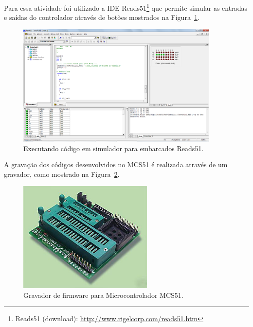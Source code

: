 \documentclass[
	12pt,				%
	openright,			%
  oneside,     %
	a4paper,			%
	english,			%
	french,				%
	spanish,			%
	brazil				%
	]{abntex2}
\begin{document}
Para essa atividade foi utilizado a IDE Reads51\footnote{Reads51 (download): \url{http://www.rigelcorp.com/reads51.htm}} que permite simular as entradas e saídas do controlador através de botões mostrados na Figura~\ref{fig:Reads51-teste-C}.

\begin{figure}[ht]
  \centering  
  \caption{\label{fig:Reads51-teste-C}Executando código em simulador para embarcados Reads51.} 
  \includegraphics[width=0.9\textwidth]{images/Atividade02/Atividade-02-02-Reads51-teste-c.png} 
\end{figure}

A gravação dos códigos desenvolvidos no MCS51 é realizada através de um gravador, como mostrado na Figura~\ref{fig:Gravador-Firmware-MCS51}.

\begin{figure}[ht]
  \centering
  \caption{\label{fig:Gravador-Firmware-MCS51}Gravador de firmware para Microcontrolador MCS51.}
  \includegraphics[width=0.6\textwidth]{images/Atividade02/Atividade-02-04-Gravador-MCS-51.jpg}
\end{figure}
\end{document}
